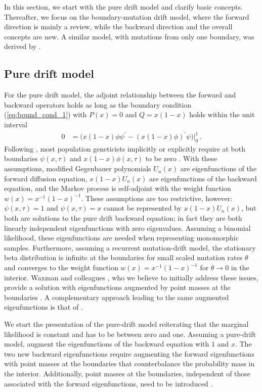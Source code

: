 \documentclass[preprint]{elsarticle}
\begin{document}
In this section, we start with the pure drift model and clarify basic concepts. Thereafter, we focus on the boundary-mutation drift model, where the forward direction is mainly a review, while the backward direction and the overall concepts are new. A similar model, with mutations from only one boundary, was derived by \citet{Evan07}.

\subsection{Pure drift model}

For the pure drift model, the adjoint relationship between the forward and backward operators holds as long as the boundary condition (\ref{eq:bound_cond_1}) with $P(x)=0$ and $Q=x(1-x)$ holds within the unit interval 
\begin{equation}\label{eq:bound_pure_drift}
\begin{split}
    0&=\big(x(1-x)\phi\psi^{'}-(x(1-x)\phi)^{'}\psi\big)\big|_0^1\,.    
\end{split}
\end{equation}
Following \citet{Kimu55}, most population geneticists implicitly or explicitly require at both boundaries $\psi(x,\tau)$ and $x(1-x)\phi(x,\tau)$ to be zero \citep[see also][]{Ewen04,Song12}. With these assumptions, modified Gegenbauer polynomials $U_n(x)$ are eigenfunctions of the forward diffusion equation, $x(1-x)U_n(x)$ are eigenfunctions of the backward equation, and the Markov process is self-adjoint with the weight function $w(x)=x^{-1}(1-x)^{-1}$. These assumptions are too restrictive, however: $\psi(x,\tau)=1$ and $\psi(x,\tau)=x$ cannot be represented by $x(1-x)U_n(x)$, but both are solutions to the pure drift backward equation; in fact they are both linearly independent eigenfunctions with zero eigenvalues. Assuming a binomial likelihood, these eigenfunctions are needed when representing monomorphic samples. Furthermore, assuming a recurrent mutation-drift model, the stationary beta distribution is infinite at the boundaries for small scaled mutation rates $\theta$ and converges to the weight function $w(x)=x^{-1}(1-x)^{-1}$ for $\theta\to0$ in the interior. Waxman and colleagues \citep{McKa07,Waxm11}, who we believe to initially  address these issues, provide a solution with eigenfunctions augmented by point masses at the boundaries \citep{McKa07,Waxm11}. A complementary approach leading to the same augmented eigenfunctions is that of \citet{Tran14b}.

We start the presentation of the pure-drift model reiterating that the marginal likelihood is constant and has to be between zero and one. Assuming a pure-drift model, \citet{Tran14b} augment the eigenfunctions of the backward equation with $1$ and $x$. The two new backward eigenfunctions require augmenting the forward eigenfunctions with point masses at the boundaries that counterbalance the probability mass in the interior. Additionally, point masses at the boundaries, independent of those associated with the forward eigenfunctions, need to be introduced \citep{Tran14b}. 
\end{document}
